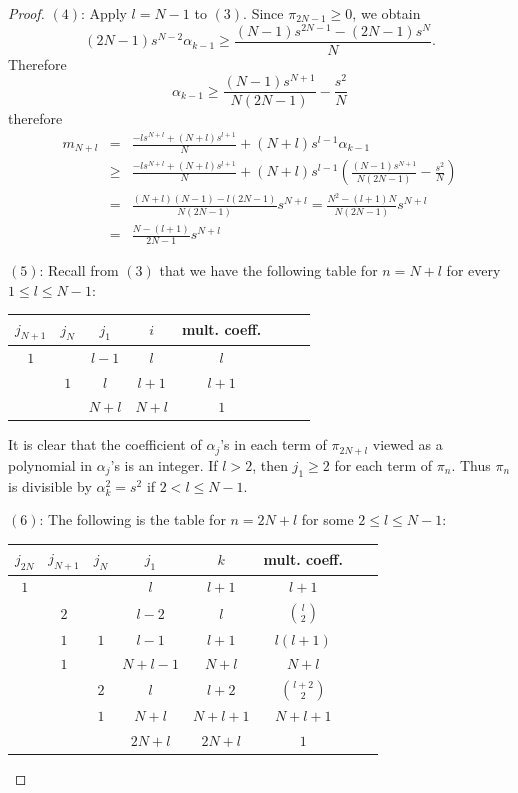 \documentclass[reqno]{amsart}
\numberwithin{equation}{section}
\theoremstyle{plain}
\theoremstyle{definition}
\begin{document}
\begin{proof}
$(4)$: Apply $l=N-1$ to $(3)$. Since $\pi_{2N-1}\geq0$, we obtain
$$(2N-1)s^{N-2}\alpha_{k-1}\geq\frac{(N-1)s^{2N-1}-(2N-1)s^N}{N}.$$
Therefore
$$\alpha_{k-1}\geq \frac{(N-1)s^{N+1}}{N(2N-1)}-\frac{s^2}{N}$$
therefore
\begin{eqnarray*}
m_{N+l}&=&\frac{-ls^{N+l}+(N+l)s^{l+1}}{N}+(N+l)s^{l-1}\alpha_{k-1}\\
&\geq& \frac{-ls^{N+l}+(N+l)s^{l+1}}{N}+(N+l)s^{l-1}\left(\frac{(N-1)s^{N+1}}{N(2N-1)}-\frac{s^2}{N}\right)\\
&=&\frac{(N+l)(N-1)-l(2N-1)}{N(2N-1)}s^{N+l}=\frac{N^2-(l+1)N}{N(2N-1)}s^{N+l}\\
&=&\frac{N-(l+1)}{2N-1}s^{N+l}
\end{eqnarray*}

$(5)$: Recall from $(3)$ that we have the following table for $n=N+l$ for every $1\leq l\leq N-1$:
\begin{center}
\begin{tabular}{ |c|c|c|c|c|c|c|c| }
\hline
  $j_{N+1}$ & $j_{N}$ & $j_1$ & $i$ & mult. coeff.\\
\hline
 $1$ & & $l-1$ & $l$ & $l$\\ 
\hline
    & $1$  & $l$ & $l+1$ & $l+1$\\ 
\hline
   &  & $N+l$ & $N+l$ & $1$\\ 
\hline
\end{tabular}
\end{center}  

It is clear that the coefficient of $\alpha_j$'s in each term of $\pi_{2N+l}$ viewed as a polynomial in $\alpha_j$'s is an integer. If $l>2$, then $j_1\geq2$ for each term of $\pi_n$. Thus $\pi_n$ is divisible by $\alpha_k^2=s^2$ if $2<l\leq N-1$.

$(6)$: The following is the table for $n=2N+l$ for some $2\leq l\leq N-1$:
\begin{center}
\begin{tabular}{ |c|c|c|c|c|c|c|c| }
\hline
 $j_{2N}$ & $j_{N+1}$ & $j_{N}$ & $j_1$ & $k$ & mult. coeff.\\
\hline
$1$ & & & $l$ & $l+1$ & $l+1$\\ 
\hline
 & $2$ & & $l-2$ & $l$ & $\binom{l}{2}$\\ 
\hline
  & $1$ & $1$ & $l-1$ & $l+1$ & $l(l+1)$\\ 
\hline
  & $1$ & & $N+l-1$ & $N+l$ & $N+l$\\ 
\hline
  & & $2$ &  $l$ & $l+2$ & $\binom{l+2}{2}$\\ 
\hline
  & & $1$ & $N+l$ & $N+l+1$ & $N+l+1$\\ 
\hline
  & &  & $2N+l$ & $2N+l$ & $1$\\ 
\hline
\end{tabular}
\end{center}  


\end{proof}
\end{document}
